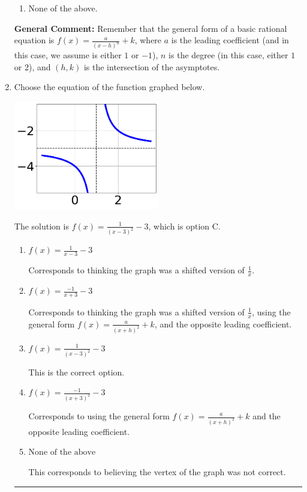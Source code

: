 \documentclass{extbook}[14pt]
\newcommand{\litem}[1]{\item #1

\rule{\textwidth}{0.4pt}}
\begin{document}
\begin{enumerate}
{\begin{enumerate}[label=\Alph*.]
\begin{multicols}{2}
\end{multicols}\item None of the above.\end{enumerate}
\textbf{General Comment:} Remember that the general form of a basic rational equation is $ f(x) = \frac{a}{(x-h)^n} + k$, where $a$ is the leading coefficient (and in this case, we assume is either $1$ or $-1$), $n$ is the degree (in this case, either $1$ or $2$), and $(h, k)$ is the intersection of the asymptotes.
}
\litem{
Choose the equation of the function graphed below.

\begin{center}
    \includegraphics[width=0.5\textwidth]{../Figures/rationalGraphToEquationB.png}
\end{center}


The solution is \( f(x) = \frac{1}{(x - 3)^2} - 3 \), which is option C.\begin{enumerate}[label=\Alph*.]
\item \( f(x) = \frac{1}{x - 3} - 3 \)

Corresponds to thinking the graph was a shifted version of $\frac{1}{x}$.
\item \( f(x) = \frac{-1}{x + 3} - 3 \)

Corresponds to thinking the graph was a shifted version of $\frac{1}{x}$, using the general form $f(x) = \frac{a}{(x+h)^2}+k$, and the opposite leading coefficient.
\item \( f(x) = \frac{1}{(x - 3)^2} - 3 \)

This is the correct option.
\item \( f(x) = \frac{-1}{(x + 3)^2} - 3 \)

Corresponds to using the general form $f(x) = \frac{a}{(x+h)^2}+k$ and the opposite leading coefficient.
\item \( \text{None of the above} \)

This corresponds to believing the vertex of the graph was not correct.
\end{enumerate}

}
\end{enumerate}
\end{document}
